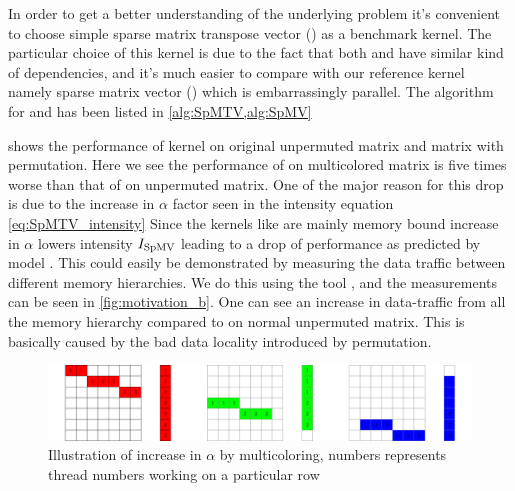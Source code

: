  In order to get a better understanding of the underlying problem it's convenient to choose simple sparse matrix transpose vector (\SpMTV) as a benchmark kernel. The particular choice of this kernel is due to the fact that both \KACZ and \SpMTV have similar kind of dependencies, and it's much easier to compare with our reference kernel namely sparse matrix vector (\SpMV) which is embarrassingly parallel. The algorithm for \SpMTV and \SpMV has been listed in \cref{alg:SpMTV,alg:SpMV}
 
 
  
  shows the performance of \SpMV kernel on original unpermuted matrix and matrix with \MC permutation. Here we see the performance of \SpMV on multicolored matrix is  five times  worse than that of  \SpMV on unpermuted matrix. One of the major reason for this drop is due to the increase in $\alpha$ factor seen in the intensity equation \cref{eq:SpMTV_intensity}  Since the kernels like \SpMV  are mainly memory bound increase in $\alpha$ lowers intensity $I_\mathrm{SpMV}$ leading to a drop of performance as predicted by \roofline model \cite{Williams_roofline}. This could easily be demonstrated by measuring the data traffic between different memory hierarchies.  We do this using the \LIKWID tool \cite{LIKWID}, and the measurements can be seen in \cref{fig:motivation_b}. One can see an increase in data-traffic from all the memory hierarchy compared to \SpMV on normal unpermuted matrix. This is basically caused by the bad data locality introduced by \MCfull permutation.
 
  \begin{figure}[htbp]
  	\centering
  	\includegraphics[scale=0.45]{pics/mc_alpha_problem/mc_alpha}
  	\caption{Illustration of increase in $\alpha$ by multicoloring, numbers represents thread numbers working on a particular row}
  	\label{fig:mc_alpha}
  \end{figure}
  
